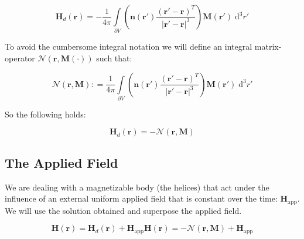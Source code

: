\begin{equation}
\textbf{H}_d(\textbf{r})  = - \frac{1}{4\pi}\int\limits_{\partial V}\left(\textbf{n}(\textbf{r}')\frac{(\textbf{r}'-\textbf{r})^T}{|\textbf{r}'-\textbf{r}|^3}\right)\textbf{M}(\textbf{r}')\;\mathrm{d}^3r'
\end{equation}

To avoid the cumbersome integral notation we will define an integral matrix-operator $\mathcal{N}(\textbf{r},\textbf{M}(\cdot))$  such that:

\begin{equation}
 \mathcal{N}(\textbf{r},\textbf{M}) : = \frac{1}{4\pi}\int\limits_{\partial V}\left(\textbf{n}(\textbf{r}')\frac{(\textbf{r}'-\textbf{r})^T}{|\textbf{r}'-\textbf{r}|^3}\right)\textbf{M}(\textbf{r}')\;\mathrm{d}^3r'
\end{equation}

So the following holds:

\begin{equation}
\textbf{H}_d(\textbf{r}) = - \mathcal{N}(\textbf{r},\textbf{M})
\end{equation}


\subsection{The Applied Field}

We are dealing with a magnetizable body (the helices) that act under the influence of an external  uniform applied field that is constant over the time: 
$\textbf{H}_\text{app}$. We will use the solution obtained and superpose the applied field.  

\begin{subequations}
\begin{equation}
\textbf{H}(\textbf{r}) = \textbf{H}_d(\textbf{r})   + \textbf{H}_\text{app}
\end{equation}
\begin{equation}
\textbf{H}(\textbf{r}) = - \mathcal{N}(\textbf{r},\textbf{M}) + \textbf{H}_\text{app}
\end{equation}
\end{subequations}
